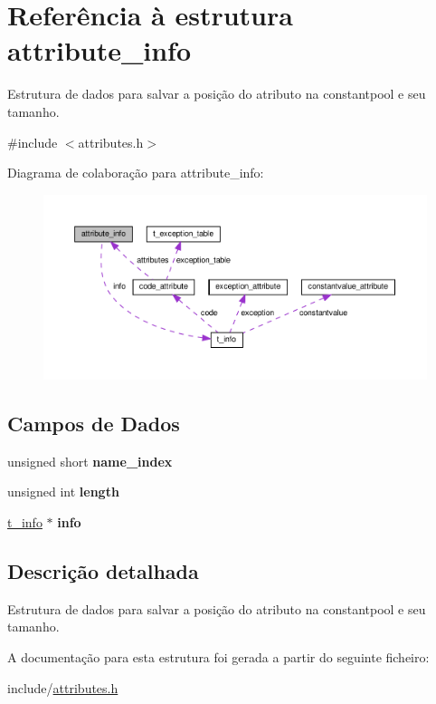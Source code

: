 \hypertarget{structattribute__info}{}\section{Referência à estrutura attribute\+\_\+info}
\label{structattribute__info}


Estrutura de dados para salvar a posição do atributo na constantpool e seu tamanho.  




{\ttfamily \#include $<$attributes.\+h$>$}



Diagrama de colaboração para attribute\+\_\+info\+:
\nopagebreak
\begin{figure}[H]
\begin{center}
\leavevmode
\includegraphics[width=350pt]{structattribute__info__coll__graph}
\end{center}
\end{figure}
\subsection*{Campos de Dados}
\begin{DoxyCompactItemize}
\item 
\mbox{\label{structattribute__info_ac90a7f38d57c03dd9b213a4191fdfe0f}} 
unsigned short {\bfseries name\+\_\+index}
\item 
\mbox{\label{structattribute__info_aa2b93ad2b4c621ba81208b0985cd3366}} 
unsigned int {\bfseries length}
\item 
\mbox{\label{structattribute__info_af3007a2d07cad3057fc835fdc7b2b774}} 
\hyperlink{uniont__info}{t\+\_\+info} $\ast$ {\bfseries info}
\end{DoxyCompactItemize}


\subsection{Descrição detalhada}
Estrutura de dados para salvar a posição do atributo na constantpool e seu tamanho. 

A documentação para esta estrutura foi gerada a partir do seguinte ficheiro\+:\begin{DoxyCompactItemize}
\item 
include/\hyperlink{attributes_8h}{attributes.\+h}\end{DoxyCompactItemize}
